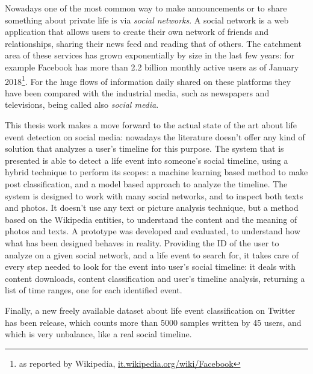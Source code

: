 Nowadays one of the most common way to make announcements or to share something about private life is via \emph{social networks}. A social network is a web application that allows users to create their own network of friends and relationships, sharing their news feed and reading that of others. The 
catchment area of these services has grown exponentially by size in the last few years: for example Facebook has more than 2.2 billion monthly active users as of January 2018\footnote{as reported by Wikipedia, \url{it.wikipedia.org/wiki/Facebook}}. For the huge flows of information daily shared on these platforms they have been compared with the industrial media, such as newspapers and televisions, being called also \emph{social media}.

This thesis work makes a move forward to the actual state of the art about life event detection on social media: nowadays the literature doesn't offer any kind of solution that analyzes a user's timeline for this purpose. The system that is presented is able to detect a life event into someone's social timeline, using a hybrid technique to perform its scopes: a machine learning based method to make post classification, and a model based approach to analyze the timeline. The system is designed to work with many social networks, and to inspect both texts and photos. It doesn't use any text or picture analysis technique, but a method based on the Wikipedia entities, to understand the content and the meaning of photos and texts. A prototype was developed and evaluated, to understand how what has been designed behaves in reality. Providing the ID of the user to analyze on a given social network, and a life event to search for, it takes care of every step needed to look for the event into user's social timeline: it deals with content downloads, content classification and user's timeline analysis, returning a list of time ranges, one for each identified event.

Finally, a new freely available dataset about life event classification on Twitter has been release, which counts more than 5000 samples written by 45 users, and which is very unbalance, like a real social timeline.

